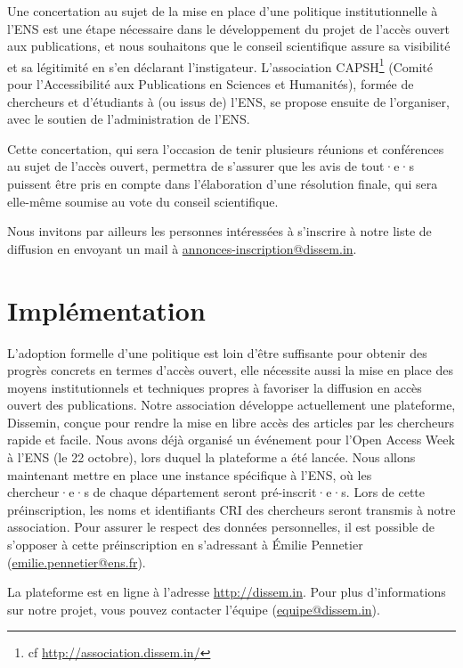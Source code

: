 \documentclass[a4paper]{article}
\begin{document}
Une concertation au sujet de la mise en place d'une politique institutionnelle à l'ENS est une étape nécessaire dans le développement du projet de l'accès ouvert aux publications, et nous souhaitons que le conseil scientifique assure sa visibilité et sa légitimité en s'en déclarant l'instigateur. L'association CAPSH\footnote{cf \url{http://association.dissem.in/}} (Comité pour l'Accessibilité aux Publications en Sciences et Humanités), formée de chercheurs et d'étudiants à (ou issus de) l'ENS, se propose ensuite de l'organiser, avec le soutien de l'administration de l'ENS. 

Cette concertation, qui sera l'occasion de tenir plusieurs réunions et conférences au sujet de l'accès ouvert, permettra de s'assurer que les avis de tout·e·s puissent être pris en compte dans l'élaboration d'une résolution finale, qui sera elle-même soumise au vote du conseil scientifique.

Nous invitons par ailleurs les personnes intéressées à s'inscrire à notre liste de diffusion en envoyant un mail à \url{annonces-inscription@dissem.in}.

\section*{Implémentation}

L'adoption formelle d'une politique est loin d'être suffisante pour obtenir des
progrès concrets en termes d'accès ouvert, elle nécessite aussi la mise en place des moyens institutionnels et techniques propres à favoriser la diffusion en accès ouvert des publications. Notre association développe actuellement une plateforme, Dissemin, conçue pour rendre la mise en libre accès des articles par les chercheurs rapide et facile. Nous avons déjà organisé un événement pour l'Open Access Week à l'ENS (le 22 octobre), lors duquel la plateforme a été lancée. Nous allons maintenant mettre en place une instance spécifique à l'ENS, où les chercheur·e·s de chaque département seront pré-inscrit·e·s. Lors de cette préinscription, les noms et identifiants CRI des chercheurs seront transmis à notre association. Pour assurer le respect des données personnelles, il est possible de s'opposer à cette préinscription en s'adressant à Émilie Pennetier (\url{emilie.pennetier@ens.fr}).

La plateforme est en ligne à l'adresse \url{http://dissem.in}. Pour plus d'informations sur notre projet, vous pouvez contacter l'équipe (\url{equipe@dissem.in}).
\end{document}
